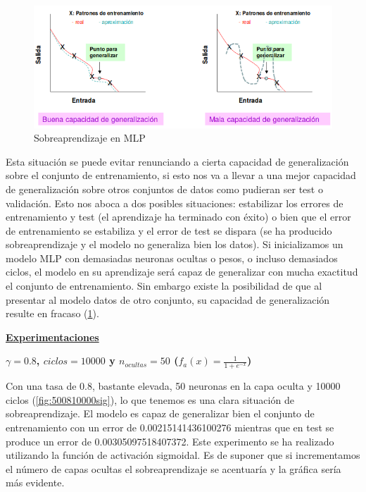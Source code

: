\documentclass[11pt,spanish,listoffigures,listoftables]{tfgetsinf}
\begin{document}
\begin{figure}[H]
\centering
\includegraphics[scale=0.5]{sobreaprendizaje}
\caption{Sobreaprendizaje en MLP \cite{MLP}}\label{fig:sobreaprendizaje}
\end{figure}

\par Esta situación se puede evitar renunciando a cierta capacidad de generalización sobre el conjunto de entrenamiento, si esto nos va a llevar a una mejor capacidad de generalización sobre otros conjuntos de datos como pudieran ser test o validación. Esto nos aboca a dos posibles situaciones: estabilizar los errores de entrenamiento y test (el aprendizaje ha terminado con éxito) o bien que el error de entrenamiento se estabiliza y el error de test se dispara (se ha producido sobreaprendizaje y el modelo no generaliza bien los datos). Si inicializamos un modelo MLP con demasiadas neuronas ocultas o pesos, o incluso demasiados ciclos, el modelo en su aprendizaje será capaz de generalizar con mucha exactitud el conjunto de entrenamiento. Sin embargo existe la posibilidad de que al presentar al modelo datos de otro conjunto, su capacidad de generalización resulte en fracaso (\ref{fig:sobreaprendizaje}). 

\par \underline{\textbf{Experimentaciones}}

\par \textbf{$\gamma = 0.8$, $ciclos = 10000$ y $n_{ocultas} = 50$ ($f_{a}(x) = \frac{1}{1+e^{-x}}$)}

\par Con una tasa de 0.8, bastante elevada, 50 neuronas en la capa oculta y 10000 ciclos (\ref{fig:500810000sig}), lo que tenemos es una clara situación de sobreaprendizaje. El modelo es capaz de generalizar bien el conjunto de entrenamiento con un error de 0.00215141436100276 mientras que en test se produce un error de 0.00305097518407372. Este experimento se ha realizado utilizando la función de activación sigmoidal. Es de suponer que si incrementamos el número de capas ocultas el sobreaprendizaje se acentuaría y la gráfica sería más evidente.
\end{document}
